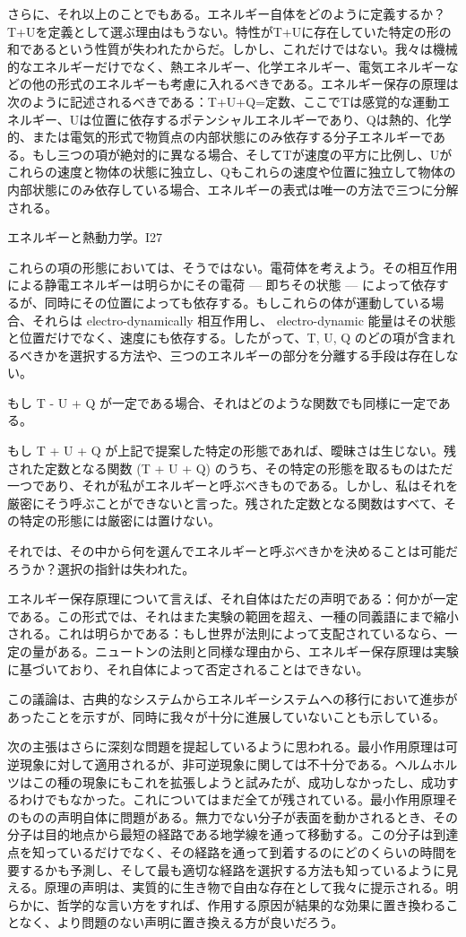 \documentclass[a4paper,11pt,openany]{ltjsbook}
\begin{document}
さらに、それ以上のことでもある。エネルギー自体をどのように定義するか？T+Uを定義として選ぶ理由はもうない。特性がT+Uに存在していた特定の形の和であるという性質が失われたからだ。しかし、これだけではない。我々は機械的なエネルギーだけでなく、熱エネルギー、化学エネルギー、電気エネルギーなどの他の形式のエネルギーも考慮に入れるべきである。エネルギー保存の原理は次のように記述されるべきである：T+U+Q=定数、ここでTは感覚的な運動エネルギー、Uは位置に依存するポテンシャルエネルギーであり、Qは熱的、化学的、または電気的形式で物質点の内部状態にのみ依存する分子エネルギーである。もし三つの項が絶対的に異なる場合、そしてTが速度の平方に比例し、Uがこれらの速度と物体の状態に独立し、Qもこれらの速度や位置に独立して物体の内部状態にのみ依存している場合、エネルギーの表式は唯一の方法で三つに分解される。

エネルギーと熱動力学。I27

これらの項の形態においては、そうではない。電荷体を考えよう。その相互作用による静電エネルギーは明らかにその電荷 — 即ちその状態 — によって依存するが、同時にその位置によっても依存する。もしこれらの体が運動している場合、それらは electro-dynamically 相互作用し、 electro-dynamic 能量はその状態と位置だけでなく、速度にも依存する。したがって、T, U, Q のどの項が含まれるべきかを選択する方法や、三つのエネルギーの部分を分離する手段は存在しない。

もし T - U + Q が一定である場合、それはどのような関数でも同様に一定である。

もし T + U + Q が上記で提案した特定の形態であれば、曖昧さは生じない。残された定数となる関数  (T + U + Q) のうち、その特定の形態を取るものはただ一つであり、それが私がエネルギーと呼ぶべきものである。しかし、私はそれを厳密にそう呼ぶことができないと言った。残された定数となる関数はすべて、その特定の形態には厳密には置けない。

それでは、その中から何を選んでエネルギーと呼ぶべきかを決めることは可能だろうか？選択の指針は失われた。

エネルギー保存原理について言えば、それ自体はただの声明である：何かが一定である。この形式では、それはまた実験の範囲を超え、一種の同義語にまで縮小される。これは明らかである：もし世界が法則によって支配されているなら、一定の量がある。ニュートンの法則と同様な理由から、エネルギー保存原理は実験に基づいており、それ自体によって否定されることはできない。

この議論は、古典的なシステムからエネルギーシステムへの移行において進歩があったことを示すが、同時に我々が十分に進展していないことも示している。

次の主張はさらに深刻な問題を提起しているように思われる。最小作用原理は可逆現象に対して適用されるが、非可逆現象に関しては不十分である。ヘルムホルツはこの種の現象にもこれを拡張しようと試みたが、成功しなかったし、成功するわけでもなかった。これについてはまだ全てが残されている。最小作用原理そのものの声明自体に問題がある。無力でない分子が表面を動かされるとき、その分子は目的地点から最短の経路である地学線を通って移動する。この分子は到達点を知っているだけでなく、その経路を通って到着するのにどのくらいの時間を要するかも予測し、そして最も適切な経路を選択する方法も知っているように見える。原理の声明は、実質的に生き物で自由な存在として我々に提示される。明らかに、哲学的な言い方をすれば、作用する原因が結果的な効果に置き換わることなく、より問題のない声明に置き換える方が良いだろう。
\end{document}
